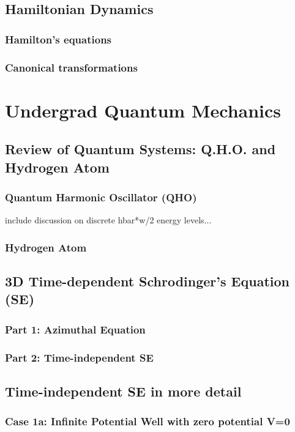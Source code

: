 \documentclass[]{article}
\begin{document}
\subsection{Hamiltonian Dynamics}
\subsubsection{Hamilton's equations}
\subsubsection{Canonical transformations}
\section{Undergrad Quantum Mechanics}
\subsection{Review of Quantum Systems: Q.H.O. and Hydrogen Atom}
\subsubsection{Quantum Harmonic Oscillator (QHO)}
include discussion on discrete hbar*w/2 energy levels...
\subsubsection{Hydrogen Atom}

\subsection{3D Time-dependent Schrodinger's Equation (SE)}
\subsubsection{Part 1: Azimuthal Equation}
\subsubsection{Part 2: Time-independent SE}

\subsection{Time-independent SE in more detail}
\subsubsection{Case 1a: Infinite Potential Well with zero potential V=0} 
\end{document}
